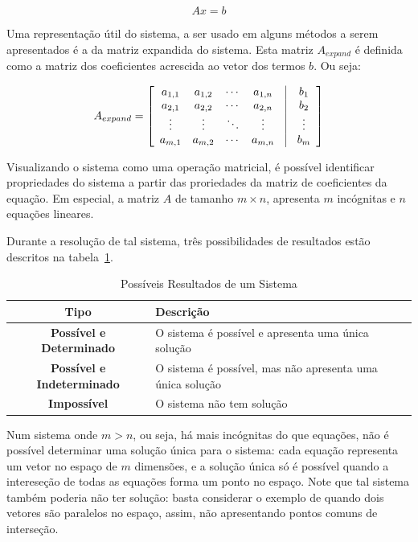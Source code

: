 \documentclass[a4paper,10pt]{report}
\begin{document}
\begin{equation}
Ax = b
\label{eqn:sistemas}
\end{equation} 

Uma representação útil do sistema, a ser usado em alguns métodos a serem apresentados é a da matriz expandida do sistema. Esta matriz $A_{expand}$ é definida como a matriz dos coeficientes acrescida ao vetor dos termos $b$. Ou seja:

\[
A_{expand} = \left[ \begin{array}{cccccc}
a_{1,1} & a_{1,2} & \cdots & a_{1,n} & \vline & b_{1} \\
a_{2,1} & a_{2,2} & \cdots & a_{2,n} & \vline & b_{2} \\
\vdots  & \vdots & \ddots & \vdots & \vline & \vdots \\
a_{m,1} & a_{m,2} & \cdots & a_{m,n} & \vline & b_{m} 
\end{array}\right]
\]

Visualizando o sistema como uma operação matricial, é possível identificar propriedades do sistema a partir das proriedades da matriz de coeficientes da equação. Em especial, a matriz $A$ de tamanho $m \times n$, apresenta $m$ incógnitas e $n$ equações lineares.

Durante a resolução de tal sistema, três possibilidades de resultados estão descritos na tabela~\ref{tab:sistemas}.

\begin{table}[ht]
\centering
\caption{Possíveis Resultados de um Sistema}
        \begin{tabular}{|c|p{2in}|}
        \hline
        \textbf{Tipo} & \textbf{Descrição} \\ \hline
        \textbf{Possível e Determinado} & O sistema é possível e apresenta uma única solução \\ \hline
        \textbf{Possível e Indeterminado} & O sistema é possível, mas não apresenta uma única solução \\ \hline
        \textbf{Impossível} & O sistema não tem solução \\ \hline
        \end{tabular}
\label{tab:sistemas}
\end{table} 

Num sistema onde $m > n$, ou seja, há mais incógnitas do que equações, não é possível determinar uma solução única para o sistema: cada equação representa um vetor no espaço de $m$ dimensões, e a solução única só é possível quando a intereseção de todas as equações forma um ponto no espaço. Note que tal sistema também poderia não ter solução: basta considerar o exemplo de quando dois vetores são paralelos no espaço, assim, não apresentando pontos comuns de interseção.
\end{document}
